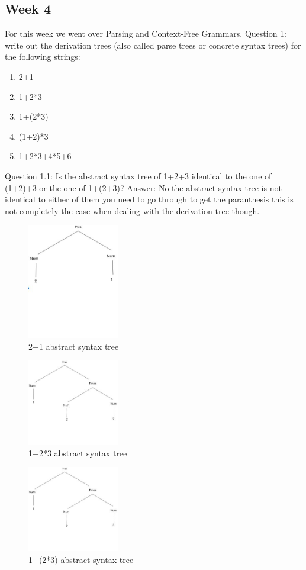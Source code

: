 \documentclass{article}
\theoremstyle{theorem}
\theoremstyle{definition}
\theoremstyle{remark}
\begin{document}
\subsection{Week 4}
For this week we went over Parsing and Context-Free Grammars.
Question 1:
write out the derivation trees (also called parse trees or concrete syntax trees) for the following strings:
\begin{enumerate}

\item 2+1
\item 1+2*3
\item 1+(2*3)
\item (1+2)*3
\item 1+2*3+4*5+6

    \end{enumerate}
    Question 1.1:
    Is the abstract syntax tree of 1+2+3 identical to the one of (1+2)+3 or the one of 1+(2+3)?
    Answer: No the abstract syntax tree is not identical to either of them you need to go through to get the paranthesis this is not completely the case when dealing with the derivation tree though.
 \begin{figure}[htp]
    \centering
    \includegraphics[width=4cm]{1st}
    \caption{ 2+1  abstract syntax tree }
    \label{fig: 2+1}
\end{figure}
 \begin{figure}[htp]
    \centering
    \includegraphics[width=4cm]{2nd}
    \caption{1+2*3 abstract syntax tree}
    \label{fig:1+2*3}
\end{figure}
 \begin{figure}[htp]
    \centering
    \includegraphics[width=4cm]{2nd}
    \caption{1+(2*3)  abstract syntax tree}
    \label{fig:1+(2*3)}
\end{figure}
\end{document}
